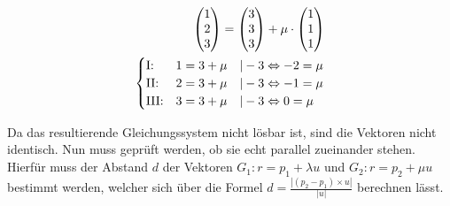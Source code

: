 \begin{align*}
    \begin{pmatrix}
        1 \\ 2 \\ 3
    \end{pmatrix} = \begin{pmatrix}
        3 \\ 3 \\ 3
    \end{pmatrix} + \mu \cdot \begin{pmatrix}
        1 \\ 1 \\ 1
    \end{pmatrix} \\
    \begin{cases}
        \text{I:\@} & 1 = 3 + \mu \quad | -3 \Leftrightarrow -2 = \mu\\
        \text{II:\@} & 2 = 3 + \mu \quad | -3 \Leftrightarrow -1 = \mu\\
        \text{III:\@} & 3 = 3 + \mu \quad | -3 \Leftrightarrow 0 = \mu
    \end{cases}
\end{align*}

Da das resultierende Gleichungssystem nicht lösbar ist, sind die Vektoren nicht identisch. Nun muss geprüft werden, ob sie echt parallel zueinander stehen. Hierfür muss der Abstand $d$ der Vektoren $G_1: r = p_1 + \lambda u$ und $G_2: r = p_2 + \mu u$ bestimmt werden, welcher sich über die Formel $d = \frac{|(p_2 - p_1) \times u|}{|u|}$ berechnen lässt.

